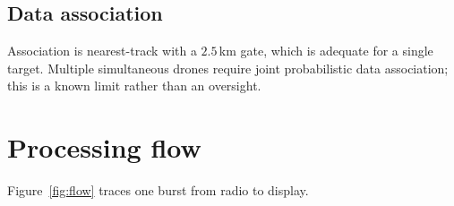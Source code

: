 \documentclass[11pt,a4paper]{article}
\begin{document}
\subsection{Data association}

Association is nearest-track with a $2.5$\,km gate, which is adequate for a
single target. Multiple simultaneous drones require joint probabilistic data
association; this is a known limit rather than an oversight.

\section{Processing flow}

Figure~\ref{fig:flow} traces one burst from radio to display.
\end{document}
